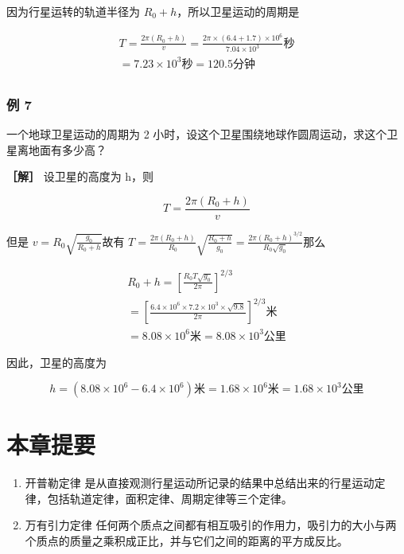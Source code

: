 因为行星运转的轨道半径为 \(R_0 + h\)，所以卫星运动的周期是

\[
\begin{array}{l} T = \frac {2 \pi (R _ {0} + h)}{v} = \frac {2 \pi \times (6.4 + 1.7) \times 10 ^ {6}}{7.04 \times 10 ^ {3}} \text{秒} \\ = 7.23 \times 10 ^ {3} \text{秒} = 120.5 \text{分钟} \\ \end{array}
\]

\subsubsection{例 7}\label{ux4f8b-7-8}

一个地球卫星运动的周期为 2
小时，设这个卫星围绕地球作圆周运动，求这个卫星离地面有多少高？

\textbf{［解］} 设卫星的高度为 h，则

\[
T = \frac {2 \pi (R _ {0} + h)}{v}
\]

但是 \(v = R_0\sqrt{\frac{g_0}{R_0 + h}}\)故有
\(T = \frac{2\pi(R_0 + h)}{R_0}\sqrt{\frac{R_0 + h}{g_0}} = \frac{2\pi(R_0 + h)^{3 / 2}}{R_0\sqrt{g_0}}\)那么

\[
\begin{array}{l} R_0+h=\left[\frac{R_0T\sqrt{g_0}}{2\pi}\right]^{2/3}\\ =\left[\frac{6.4\times10^6\times7.2\times10^3\times\sqrt{9.8}}{2\pi}\right]^{2/3}\text{米}\\ =8.08\times10^6\text{米}=8.08\times10^3\text{公里} \end{array}
\]

因此，卫星的高度为

\[
h=(8.08\times10^6-6.4\times10^6)\text{米} =1.68\times10^6\text{米} =1.68\times10^3\text{公里}
\]

\section{本章提要}\label{ux672cux7ae0ux63d0ux8981-13}

\begin{enumerate}
\def\labelenumi{\arabic{enumi}.}
\item
  开普勒定律
  是从直接观测行星运动所记录的结果中总结出来的行星运动定律，包括轨道定律，面积定律、周期定律等三个定律。
\item
  万有引力定律
  任何两个质点之间都有相互吸引的作用力，吸引力的大小与两个质点的质量之乘积成正比，并与它们之间的距离的平方成反比。
\end{enumerate}

